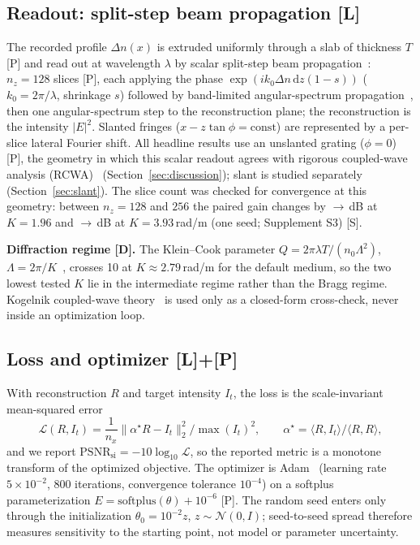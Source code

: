 \documentclass{optica-article}
\begin{document}
\subsection{Readout: split-step beam propagation [L]}
\label{sec:model-readout}
The recorded profile $\Delta n(x)$ is extruded uniformly through a slab of
thickness $T$ [P] and read out at wavelength $\lambda$ by scalar split-step
beam propagation~\cite{feit1978light}: $n_z=128$ slices [P], each applying
the phase $\exp(ik_0\Delta n\,\mathrm{d}z(1-s))$ ($k_0=2\pi/\lambda$,
shrinkage $s$) followed by band-limited angular-spectrum
propagation~\cite{goodman2005fourier}, then one angular-spectrum step to
the reconstruction plane; the reconstruction is the intensity $|E|^2$.
Slanted fringes ($x-z\tan\phi=\text{const}$) are represented by a
per-slice lateral Fourier shift. All headline results use an unslanted
grating ($\phi=0$) [P], the geometry in which this scalar readout agrees
with rigorous coupled-wave analysis (RCWA)~\cite{moharam1981rigorous}
(Section~\ref{sec:discussion}); slant is studied separately
(Section~\ref{sec:slant}). The slice count was checked for convergence at
this geometry: between $n_z=128$ and $256$ the paired gain changes by
\NZZeroGainKLowOneTwentyEight$\to$\NZZeroGainKLowTwoFiftySix\,dB at
$K=1.96$ and \NZZeroGainKMidOneTwentyEight$\to$\NZZeroGainKMidTwoFiftySix\,dB
at $K=3.93$\,rad/\textmu m (one seed; Supplement S3) [S].

\textbf{Diffraction regime [D].} The Klein--Cook parameter
$Q=2\pi\lambda T/(n_0\Lambda^2)$, $\Lambda=2\pi/K$~\cite{klein1967unified},
crosses 10 at $K\approx2.79$\,rad/\textmu m for the default medium, so the
two lowest tested $K$ lie in the intermediate regime rather than the Bragg
regime. Kogelnik coupled-wave theory~\cite{kogelnik1969coupled} is used only
as a closed-form cross-check, never inside an optimization loop.

\subsection{Loss and optimizer [L]+[P]}
\label{sec:model-loss}
With reconstruction $R$ and target intensity $I_t$, the loss is the
scale-invariant mean-squared error
\begin{equation}
\label{eq:si-mse}
\mathcal{L}(R,I_t)=\frac{1}{n_x}\big\|\alpha^\star R-I_t\big\|_2^2\big/\max(I_t)^2,\qquad
\alpha^\star=\langle R,I_t\rangle/\langle R,R\rangle,
\end{equation}
and we report $\mathrm{PSNR}_{\text{si}}=-10\log_{10}\mathcal{L}$, so the
reported metric is a monotone transform of the optimized objective. The
optimizer is Adam~\cite{kingma2015adam} (learning rate $5\times10^{-2}$,
$800$ iterations, convergence tolerance $10^{-4}$) on a softplus
parameterization $E=\mathrm{softplus}(\theta)+10^{-6}$ [P]. The random seed
enters only through the initialization $\theta_0=10^{-2}z$,
$z\sim\mathcal{N}(0,I)$; seed-to-seed spread therefore measures sensitivity
to the starting point, not model or parameter uncertainty.
\end{document}
